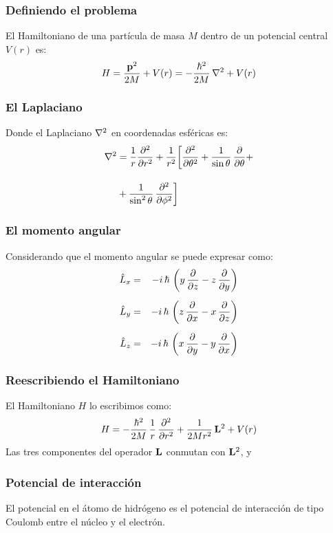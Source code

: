 \documentclass[12pt]{beamer}
\begin{document}
\begin{frame}
\frametitle{Definiendo el problema}
El Hamiltoniano de una partícula de masa $M$ dentro de un potencial central $V (r)$ es:
\pause
\begin{align}
H = \dfrac{\vb{p}^{2}}{2 M} + V (r) = - \dfrac{\hbar^{2}}{2 M} \, \laplacian + V (r)
\label{eq:ecuacion_08_01}
\end{align}
\end{frame}
\begin{frame}
\frametitle{El Laplaciano}
Donde el Laplaciano $\laplacian$ en coordenadas esféricas es:
\pause
\begin{align}
\begin{aligned}
\laplacian &= \dfrac{1}{r} \pdv[2]{r} + \dfrac{1}{r^{2}} \bigg[ \pdv[2]{\theta} + \dfrac{1}{\sin \theta} \, \pdv{\theta} + \\[1em]
&+\dfrac{1}{\sin^{2} \theta} \, \pdv[2]{\phi} \bigg]
\end{aligned}
\label{eq:ecuacion_08_02}
\end{align}
\end{frame}
\begin{frame}
\frametitle{El momento angular}
Considerando que el momento angular se puede expresar como:
\pause
\begin{align}
\begin{aligned}
\hat{L}_{x} &=& - i \, \hbar \, \left( y \, \pdv{z} - z \, \pdv{y} \right) \\[0.5em] 
\hat{L}_{y} &=& - i \, \hbar \, \left( z \, \pdv{x} - x \, \pdv{z} \right) \\[0.5em] 
\hat{L}_{z} &=& - i \, \hbar \, \left( x \, \pdv{y} - y \, \pdv{x} \right)
\end{aligned}
\label{eq:ecuacion_01_03a}
\end{align}
\end{frame}
\begin{frame}
\frametitle{Reescribiendo el Hamiltoniano}
El Hamiltoniano $H$ lo escribimos como:
\pause
\begin{align}
H = - \dfrac{\hbar^{2}}{2 M} \, \dfrac{1}{r} \, \pdv[2]{r} + \dfrac{1}{2 M r^{2}} \, \vb{L}^{2} + V (r)
\label{eq:ecuacion_08_03}
\end{align}
Las tres componentes del operador $\vb{L}$ conmutan con $\vb{L}^{2}$, y
\end{frame}
\begin{frame}
\frametitle{Potencial de interacción}
El potencial en el átomo de hidrógeno es el potencial de interacción de tipo Coulomb entre el núcleo y el electrón.
\end{frame}
\end{document}
